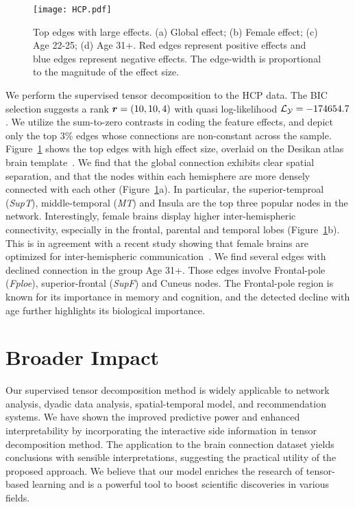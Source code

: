 \documentclass{article}
\theoremstyle{definition}
\theoremstyle{definition}
\begin{document}
\begin{figure}[!h]
\centering
\texttt{[image: HCP.pdf]}
\caption{Top edges with large effects. (a) Global effect; (b) Female effect; (c) Age 22-25; (d) Age 31+. Red edges represent positive effects and blue edges represent negative effects. The edge-width is proportional to the magnitude of the effect size.
}\label{fig:brain}
\end{figure}


We perform the supervised tensor decomposition to the HCP data. %
The BIC selection suggests a rank $\bm{r}=(10,10,4)$ with quasi log-likelihood $\mathcal{L}_{\mathcal{Y}}=-174654.7$. We utilize the sum-to-zero contrasts in coding the feature effects, and depict only the top 3\% edges whose connections are non-constant across the sample. Figure~\ref{fig:brain} shows the top edges with high effect size, overlaid on the Desikan atlas brain template~\citep{desikan2006automated}. We find that the global connection exhibits clear spatial separation, and that the nodes within each hemisphere are more densely connected with each other (Figure~\ref{fig:brain}a). In particular, the superior-temproal (\emph{SupT}), middle-temporal (\emph{MT}) and Insula are the top three popular nodes in the network. Interestingly, female brains display higher inter-hemispheric connectivity, especially in the frontal, parental and temporal lobes (Figure~\ref{fig:brain}b). This is in agreement with a recent study showing that female brains are optimized for inter-hemispheric communication~\citep{ingalhalikar2014sex}. We find several edges with declined connection in the group Age 31+. Those edges involve Frontal-pole (\emph{Fploe}), superior-frontal (\emph{SupF}) and Cuneus nodes. The Frontal-pole region is known for its importance in memory and cognition, and the detected decline with age further highlights its biological importance. 


\newpage 
\section*{Broader Impact}

Our supervised tensor decomposition method is widely applicable to network analysis, dyadic data analysis, spatial-temporal model, and recommendation systems. We have shown the improved predictive power and enhanced interpretability by incorporating the interactive side information in tensor decomposition method.  The application to the brain connection dataset yields conclusions with sensible interpretations, suggesting the practical utility of the proposed approach.  We believe that our model enriches the research of tensor-based learning and is a powerful tool to boost scientific discoveries in various fields. 
\end{document}
